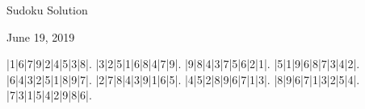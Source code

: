 \documentclass{article}
\begin{document}
\begin{center}
\Huge{Sudoku Solution}
\end{center}
\begin{center}
\Large{June 19, 2019}
\end{center}
\begin{sudoku}
|1|6|7|9|2|4|5|3|8|.
|3|2|5|1|6|8|4|7|9|.
|9|8|4|3|7|5|6|2|1|.
|5|1|9|6|8|7|3|4|2|.
|6|4|3|2|5|1|8|9|7|.
|2|7|8|4|3|9|1|6|5|.
|4|5|2|8|9|6|7|1|3|.
|8|9|6|7|1|3|2|5|4|.
|7|3|1|5|4|2|9|8|6|.
\end{sudoku}
\end{document}
